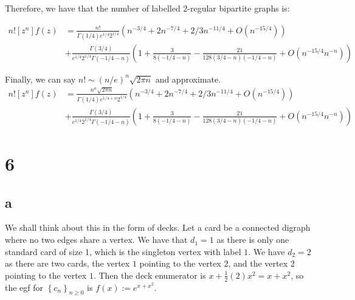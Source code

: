 \documentclass[]{article}
\begin{document}
Therefore, we have that the number of labelled $2$-regular bipartite graphs is:

\begin{align}
	n! [z^n] f(z)&=
\frac{n!}{\Gamma(1/4) e^{1/4} 2^{1/4}}\left( n^{-3/4} +  2 n^{-7/4} + 2/3 n^{-11/4} + O(n^{-15/4}) \right)\\ 
&+
\frac{\Gamma(3/4)}{e^{1/4} 2^{1/4} \Gamma(-1/4 - n)}  \left(1+ \frac{3}{8 (-1/4 - n)} - \frac{21}{128 (3/4 - n)(-1/4 - n)}+  O(n^{-15/4} n^{-n})\right)
\end{align}

Finally, we can say $n! \sim (n/e)^n\sqrt{2 \pi n}$ and approximate. 
\begin{align}
	n! [z^n] f(z)&=
	\frac{n^n \sqrt{2 \pi n}}{\Gamma(1/4) e^{1/4 + n} 2^{1/4}}\left( n^{-3/4} +  2 n^{-7/4} + 2/3 n^{-11/4} + O(n^{-15/4}) \right)\\ 
	&+
	\frac{\Gamma(3/4)}{e^{1/4} 2^{1/4} \Gamma(-1/4 - n)}  \left(1+ \frac{3}{8 (-1/4 - n)} - \frac{21}{128 (3/4 - n)(-1/4 - n)}+  O(n^{-15/4} n^{-n})\right)
\end{align}
\section{6}
\subsection{a}
We shall think about this in the form of decks. Let a card be a connected digraph where no two edges share a vertex. We have that $d_1 = 1$ as there is only one standard card of size 1, which is the singleton vertex with label $1$. We have $d_2 = 2$ as there are two cards, the vertex $1$ pointing to the vertex $2$, and the vertex $2$ pointing to the vertex $1$. Then the deck enumerator is $x + \frac{1}{2} (2) x^2 = x + x^2$, so the egf for $\left\{ c_n\right\}_{n \geq 0}$ is $f(x) := e^{x + x^2}$.
\end{document}
